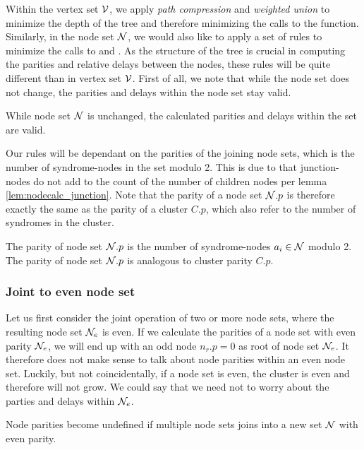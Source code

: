 Within the vertex set $\mathcal{V}$, we apply \emph{path compression} and \emph{weighted union} to minimize the depth of the tree and therefore minimizing the calls to the  function. Similarly, in the node set $\mathcal{N}$, we would also like to apply a set of rules to minimize the calls to  and . As the structure of the tree is crucial in computing the parities and relative delays between the nodes, these rules will be quite different than in vertex set $\mathcal{V}$. First of all, we note that while the node set does not change, the parities and delays within the node set stay valid.


\begin{lemma}\label{lem:nodesetunchanged}
  While node set $\mathcal{N}$ is unchanged, the calculated parities and delays within the set are valid.
\end{lemma}

Our rules will be dependant on the parities of the joining node sets, which is the number of syndrome-nodes in the set modulo 2. This is due to that junction-nodes do not add to the count of the number of children nodes per lemma \ref{lem:nodecalc_junction}. Note that the parity of a node set $\mathcal{N}.p$ is therefore exactly the same as the parity of a cluster $C.p$, which also refer to the number of syndromes in the cluster.

\begin{lemma}
  The parity of node set $\mathcal{N}.p$ is the number of syndrome-nodes $a_i \in \mathcal{N}$ modulo 2. The parity of node set $\mathcal{N}.p$ is analogous to cluster parity $C.p$.
\end{lemma}

\subsubsection{Joint to even node set}

Let us first consider the joint operation of two or more node sets, where the resulting node set $\mathcal{N}_{e}$ is even. If we calculate the parities of a node set with even parity $\mathcal{N}_e$, we will end up with an odd node $n_r.p=0$ as root of node set $\mathcal{N}_e$. It therefore does not make sense to talk about node parities within an even node set. Luckily, but not coincidentally, if a node set is even, the cluster is even and therefore will not grow. We could say that we need not to worry about the parties and delays within $\mathcal{N}_{e}$.

\begin{lemma}\label{lem:nodecalc_even}
  Node parities become undefined if multiple node sets joins into a new set $\mathcal{N}$ with even parity.
\end{lemma}


